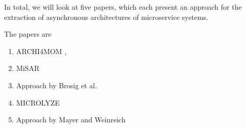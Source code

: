 
In total, we will look at five papers, which each present an approach for the extraction of asynchronous architectures of microservice systems.


The papers are
\begin{enumerate}
	\item ARCHI4MOM \cite{Singh2022ARCHI4MOM}, \cite{Singh2021}
	\item MiSAR \cite{Alshuqayran2018MiSAR}
	\item Approach by Brosig et al. \cite{Brosig2011}
	\item MICROLYZE \cite{Kleehaus2018} %
	\item Approach by Mayer and Weinreich \cite{Mayer2018} %
\end{enumerate}